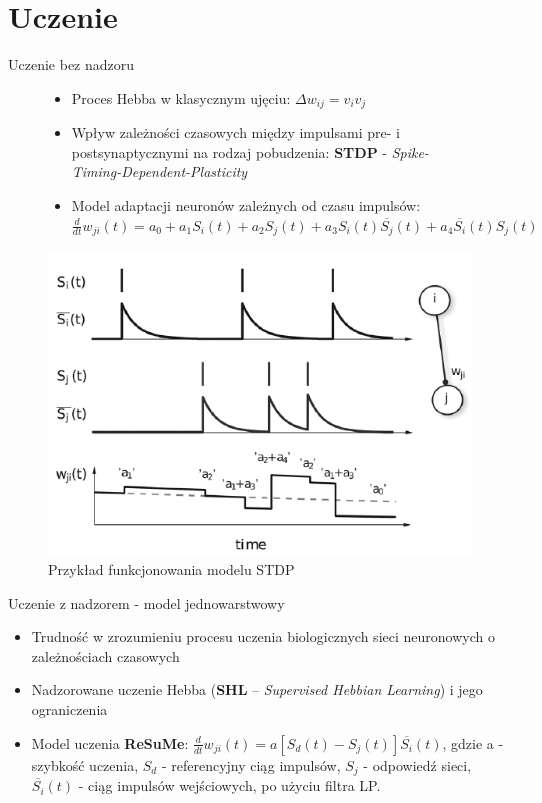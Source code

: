 \documentclass{beamer}
\begin{document}
\section{Uczenie}
\begin{frame}{Uczenie bez nadzoru}
	\begin{figure}[ht]
		\begin{minipage}{0.48\linewidth}
			\begin{itemize}
				\item Proces Hebba w klasycznym ujęciu: $\Delta w_{ij} = v_i v_j$
				\item Wpływ zależności czasowych między impulsami pre- i postsynaptycznymi na rodzaj pobudzenia: \newline \textbf{STDP} - \textit{Spike-Timing-Dependent-Plasticity}
				\item Model adaptacji neuronów zależnych od czasu impulsów: $\frac{d}{dt} w_{ji}(t) = a_0 + a_1 S_i(t) + a_2 S_j(t) + a_3 S_i(t) \overline{S_j}(t) + a_4 \overline{S_i}(t)S_j(t)$
			\end{itemize}
		\end{minipage}
		\hfill
		\begin{minipage}{0.48\linewidth}
		\centering
		\includegraphics[width=\textwidth]{STDP.png}
		\caption{Przykład funkcjonowania modelu STDP}
		\end{minipage}
	\end{figure}
\end{frame}

\begin{frame}{Uczenie z nadzorem - model jednowarstwowy}
\begin{itemize}
	\item Trudność w zrozumieniu procesu uczenia biologicznych sieci neuronowych o zależnościach czasowych
	\item Nadzorowane uczenie Hebba (\textbf{SHL} -- \textit{Supervised Hebbian Learning}) i jego ograniczenia
	\item Model uczenia \textbf{ReSuMe}: $\frac{d}{dt} w_{ji}(t) = a \left[S_d(t) - S_j(t) \right] \overline{S_i}(t)$, gdzie a - szybkość uczenia, $S_d$ - referencyjny ciąg impulsów, $S_j$ - odpowiedź sieci, $\overline{S_i}(t)$ - ciąg impulsów wejściowych, po użyciu filtra LP.
\end{itemize}
\end{frame}
\end{document}
